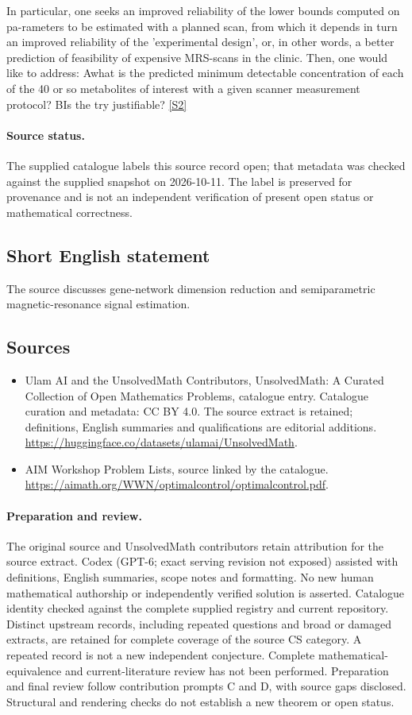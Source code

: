 \documentclass[11pt]{article}
\newcommand{\sref}[2]{\hyperlink{source:#1:#2}{[S#2]}}
\begin{document}
In particular, one seeks an improved reliability of the lower bounds computed on pa-rameters to be estimated with a planned scan, from which it depends in turn an improved reliability of the 'experimental design', or, in other words, a better prediction of feasibility of expensive MRS-scans in the clinic. Then, one would like to address: Awhat is the predicted minimum detectable concentration of each of the 40 or so metabolites of interest with a given scanner measurement protocol? BIs the try justifiable? \sref{statement}{2}
\paragraph{Source status.}
The supplied catalogue labels this source record open; that metadata was checked against the supplied snapshot on 2026-10-11. The label is preserved for provenance and is not an independent verification of present open status or mathematical correctness.
\subsection{Short English statement}
The source discusses gene-network dimension reduction and semiparametric magnetic-resonance signal estimation.
\subsection{Sources}
\begin{itemize}
\item[\hypertarget{source:statement:1}{S1}] Ulam AI and the UnsolvedMath Contributors, UnsolvedMath: A Curated Collection of Open Mathematics Problems, catalogue entry. Catalogue curation and metadata: CC BY 4.0. The source extract is retained; definitions, English summaries and qualifications are editorial additions.
\url{https://huggingface.co/datasets/ulamai/UnsolvedMath}.
\item[\hypertarget{source:statement:2}{S2}] AIM Workshop Problem Lists, source linked by the catalogue.
\url{https://aimath.org/WWN/optimalcontrol/optimalcontrol.pdf}.
\end{itemize}
\paragraph{Preparation and review.}
The original source and UnsolvedMath contributors retain attribution for the source extract. Codex (GPT-6; exact serving revision not exposed) assisted with definitions, English summaries, scope notes and formatting. No new human mathematical authorship or independently verified solution is asserted. Catalogue identity checked against the complete supplied registry and current repository. Distinct upstream records, including repeated questions and broad or damaged extracts, are retained for complete coverage of the source CS category. A repeated record is not a new independent conjecture. Complete mathematical-equivalence and current-literature review has not been performed. Preparation and final review follow contribution prompts C and D, with source gaps disclosed. Structural and rendering checks do not establish a new theorem or open status.
\label{end:statement}
\end{document}
